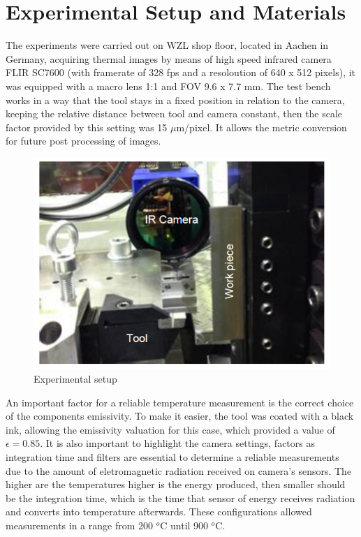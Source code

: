 	\section{Experimental Setup and Materials}
	\label{sec:exSetup}

	The experiments were carried out on WZL shop floor, located in Aachen in Germany, acquiring thermal images by means of high speed infrared camera FLIR SC7600 (with framerate of 328 fps and a resoloution of 640 x 512 pixels), it was equipped with a macro lens 1:1 and FOV 9.6 x 7.7 mm. The test bench works in a way that the tool stays in a fixed position in relation to the camera, keeping the relative distance between tool and camera constant, then the scale factor provided by this setting was 15 $\mu$m/pixel. It allows the metric conversion for future post processing of images.

	\begin{figure}[H]
		\centering
		\captionsetup{justification=centering}
		\includegraphics[scale = 0.5]{Cap3/exsetup.png}
		\caption{Experimental setup \cite{augspurger2016experimental}}
		\label{fig:exinfrared}
	\end{figure}

	An important factor for a reliable temperature measurement is the correct choice of the components emissivity. To make it easier, the tool was coated with a black ink, allowing the emissivity valuation for this case, which provided a value of $\epsilon = 0.85$. It is also important to highlight the camera settings, factors as integration time and filters are essential to determine a reliable measurements due to the amount of eletromagnetic radiation received on camera's sensors. The higher are the temperatures higher is the energy produced, then smaller should be the integration time, which is the time that sensor of energy receives radiation and converts into temperature afterwards. These configurations allowed measurements in a range from 200 $^{o}$C until 900 $^{o}$C.
	
